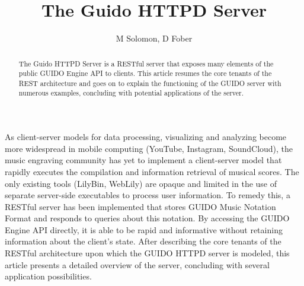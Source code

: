 \documentclass[a4paper]{article}
\title{The Guido HTTPD Server}
\author{M Solomon, D Fober}
\date{}
\begin{document}
\maketitle

\begin{abstract}
The Guido HTTPD Server is a RESTful server that exposes many elements of the public GUIDO Engine API to clients.  This article resumes the core tenants of the REST architecture and goes on to explain the functioning of the GUIDO server with numerous examples, concluding with potential applications of the server.
\end{abstract}

As client-server models for data processing, visualizing and analyzing become more widespread in mobile computing (YouTube, Instagram, SoundCloud), the music engraving community has yet to implement a client-server model that rapidly executes the compilation and information retrieval of musical scores.  The only existing tools (LilyBin, WebLily) are opaque and limited in the use of separate server-side executables to process user information.  To remedy this, a RESTful server has been implemented that stores GUIDO Music Notation Format and responds to queries about this notation.  By accessing the GUIDO Engine API directly, it is able to be rapid and informative without retaining information about the client's state.  After describing the core tenants of the RESTful architecture upon which the GUIDO HTTPD server is modeled, this article presents a detailed overview of the server, concluding with several application possibilities.

\end{document}
